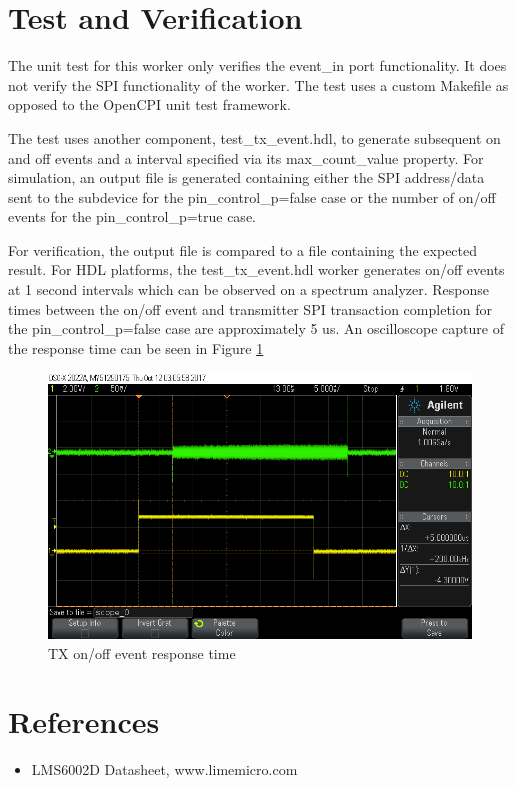 \documentclass{article}
\begin{document}
\section*{Test and Verification}
\begin{flushleft}
The unit test for this worker only verifies the event\_in port functionality. It does not verify the SPI functionality of the worker. The test uses a custom Makefile as opposed to the OpenCPI unit test framework.\par\medskip

The test uses another component, test\_tx\_event.hdl, to generate subsequent on and off events and a interval specified via its max\_count\_value property. For simulation, an output file is generated containing either the SPI address/data sent to the subdevice for the pin\_control\_p=false case or the number of on/off events for the pin\_control\_p=true case.\par\medskip

For verification, the output file is compared to a file containing the expected result. For HDL platforms, the test\_tx\_event.hdl worker generates on/off events at 1 second intervals which can be observed on a spectrum analyzer. Response times between the on/off event and transmitter SPI transaction completion for the pin\_control\_p=false case are approximately 5 us. An oscilloscope capture of the response time can be seen in Figure \ref{fig:response_time}
\begin{figure}[ht]
	\centerline{\includegraphics[scale=0.4]{txen_timing_matchstiq_z1}}
	\caption{TX on/off event response time}
	\label{fig:response_time}
\end{figure}
\end{flushleft}
\section*{References}
\begin{itemize}
	\item[1)] LMS6002D Datasheet, www.limemicro.com
\end{itemize}
\end{document}

